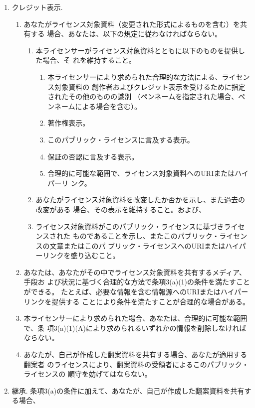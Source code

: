 {\begin{enumerate}
\item クレジット表示.

\begin{enumerate}
\item あなたがライセンス対象資料（変更された形式によるものを含む）を共有する
場合、あなたは、以下の規定に従わなければならない。

\begin{enumerate}
\item 本ライセンサーがライセンス対象資料とともに以下のものを提供した場合、そ
れを維持すること。
\begin{enumerate}
\renewcommand{\labelenumiii}{\roman{enumiii}).}
\item 本ライセンサーにより求められた合理的な方法による、ライセンス対象資料の
創作者およびクレジット表示を受けるために指定されたその他のものの識別
（ペンネームを指定された場合、ペンネームによる場合を含む）。
\item 著作権表示。
\item このパブリック・ライセンスに言及する表示。
\item 保証の否認に言及する表示。
\item 合理的に可能な範囲で、ライセンス対象資料へのURIまたはハイパーリ
  ンク。
\end{enumerate}
\item あなたがライセンス対象資料を改変したか否かを示し、また過去の改変がある
場合、その表示を維持すること。および、
\item ライセンス対象資料がこのパブリック・ライセンスに基づきライセンスされた
ものであることを示し、またこのパブリック・ライセンスの文章またはこのパ
ブリック・ライセンスへのURIまたはハイパーリンクを盛り込むこと。
\end{enumerate}
\item あなたは、あなたがその中でライセンス対象資料を共有するメディア、手段お
よび状況に基づく合理的な方法で条項3(a)(1)の条件を満たすことができる。
たとえば、必要な情報を含む情報源へのURIまたはハイパーリンクを提供する
ことにより条件を満たすことが合理的な場合がある。
\item 本ライセンサーにより求められた場合、あなたは、合理的に可能な範囲で、条
項3(a)(1)(A)により求められるいずれかの情報を削除しなければならない。
\item あなたが、自己が作成した翻案資料を共有する場合、あなたが適用する翻案者
のライセンスにより、翻案資料の受領者によるこのパブリック・ライセンスの
順守を妨げてはならない。
\end{enumerate}
\item 継承.
条項3(a)の条件に加えて、あなたが、自己が作成した翻案資料を共有する場合、

\end{enumerate}}
